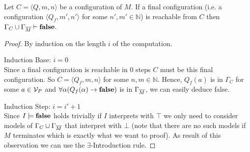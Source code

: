 \begin{claim}\label{cla.18}
	Let $C=\langle Q,m,n\rangle$ be a configuration of $M$. If a final configuration (i.e. a configuration $\langle Q_f,m',n'\rangle$ for some $n',m'\in\mathbb{N}$) is reachable from $C$ then $\Gamma_C\cup\Gamma_{\overline{M}}\vdash\textbf{false}$.
\end{claim}
\begin{proof} By induction on the length $i$ of the computation.
	
	Induction Base: $i=0$\\
	Since a final configuration is reachable in 0 steps $C$ must be this final configuration. So $C=\langle Q_f,m,n\rangle$ for some $n,m\in\mathbb{N}$. Hence, $Q_f(a)$ is in $\Gamma_C$ for some $a\in\mathcal{V}_P$ and $\forall\alpha(Q_f(\alpha)\to\textbf{false})$ is in $\Gamma_{\overline{M}}$, we can easily deduce false.
	\begin{figure}[H]
		\centering
		
	\end{figure}
	 
	Induction Step: $i= i'+1$\\
	Since $I\models\textbf{false}$ holds trivially if $I$ interprets \false{} with $\top$ we only need to consider models of $\Gamma_C\cup\Gamma_{\overline{M}}$ that interpret \false{} with $\bot$ (note that there are no such models if $M$ terminates which is exactly what we want to proof). As result of this observation we can use the $\exists$-Introduction rule.
	

\end{proof}
